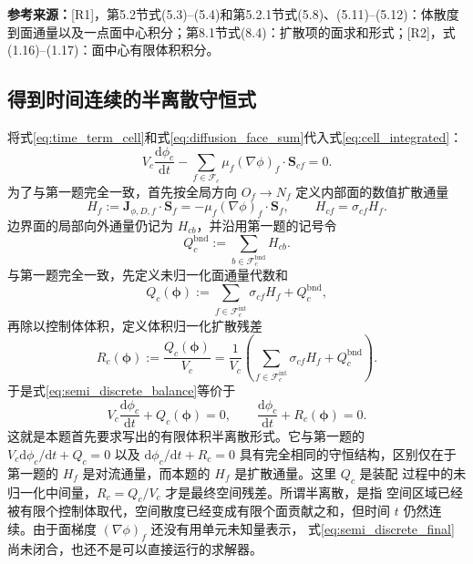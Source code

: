 \documentclass[UTF8,12pt,a4paper]{ctexart}
\numberwithin{equation}{section}
\newcommand{\Rone}{\textnormal{[R1]}}
\newcommand{\Rtwo}{\textnormal{[R2]}}
\newcommand{\source}[1]{%
  \par\smallskip
  \noindent\colorbox{sourcebg}{%
    \parbox{0.955\linewidth}{\raggedright\footnotesize\color{sourcegray}\textbf{参考来源：}#1}%
  }
  \par\smallskip
}
\newcommand{\Sf}{\bm S}
\begin{document}
\source{\Rone，第5.2节式(5.3)--(5.4)和第5.2.1节式(5.8)、(5.11)--(5.12)：体散度到面通量以及一点面中心积分；第8.1节式(8.4)：扩散项的面求和形式；\Rtwo，式(1.16)--(1.17)：面中心有限体积积分。}

\subsection{得到时间连续的半离散守恒式}

将式\eqref{eq:time_term_cell}和式\eqref{eq:diffusion_face_sum}代入式\eqref{eq:cell_integrated}：
\begin{equation}
  V_c\frac{\mathrm d\phi_c}{\mathrm dt}
  -\sum_{f\in\mathcal F_c}
  \mu_f(\nabla\phi)_f\cdot\Sf_{cf}=0.
  \label{eq:semi_discrete_balance}
\end{equation}
为了与第一题完全一致，首先按全局方向 $O_f\to N_f$ 定义内部面的数值扩散通量
\begin{equation}
  \boxed{
  H_f:=\bm J_{\phi,D,f}\cdot\Sf_f
  =-\mu_f(\nabla\phi)_f\cdot\Sf_f,
  \qquad
  H_{cf}=\sigma_{cf}H_f}.
  \label{eq:diffusive_numerical_flux}
\end{equation}
边界面的局部向外通量仍记为 $H_{cb}$，并沿用第一题的记号令
\begin{equation}
  Q_c^{\mathrm{bnd}}:=\sum_{b\in\mathcal F_c^{\mathrm{bnd}}}H_{cb}.
  \label{eq:boundary_residual_definition}
\end{equation}
与第一题完全一致，先定义未归一化面通量代数和
\begin{equation}
  \boxed{
  Q_c(\bm\phi)
  :=\sum_{f\in\mathcal F_c^{\mathrm{int}}}\sigma_{cf}H_f+Q_c^{\mathrm{bnd}}},
  \label{eq:diffusive_face_sum}
\end{equation}
再除以控制体体积，定义体积归一化扩散残差
\begin{equation}
  \boxed{
  R_c(\bm\phi):=\frac{Q_c(\bm\phi)}{V_c}
  =\frac{1}{V_c}
  \left(\sum_{f\in\mathcal F_c^{\mathrm{int}}}\sigma_{cf}H_f+Q_c^{\mathrm{bnd}}\right)}.
  \label{eq:diffusive_residual}
\end{equation}
于是式\eqref{eq:semi_discrete_balance}等价于
\begin{equation}
  \boxed{
  V_c\frac{\mathrm d\phi_c}{\mathrm dt}
  +Q_c(\bm\phi)=0,
  \qquad
  \frac{\mathrm d\phi_c}{\mathrm dt}
  +R_c(\bm\phi)=0}.
  \label{eq:semi_discrete_final}
\end{equation}
这就是本题首先要求写出的有限体积半离散形式。它与第一题的
$V_c\mathrm d\phi_c/\mathrm dt+Q_c=0$ 以及
$\mathrm d\phi_c/\mathrm dt+R_c=0$ 具有完全相同的守恒结构，区别仅在于
第一题的 $H_f$ 是对流通量，而本题的 $H_f$ 是扩散通量。这里 $Q_c$ 是装配
过程中的未归一化中间量，$R_c=Q_c/V_c$ 才是最终空间残差。所谓半离散，是指
空间区域已经被有限个控制体取代，空间散度已经变成有限个面贡献之和，但时间
$t$ 仍然连续。由于面梯度 $(\nabla\phi)_f$ 还没有用单元未知量表示，
式\eqref{eq:semi_discrete_final}尚未闭合，也还不是可以直接运行的求解器。
\end{document}
